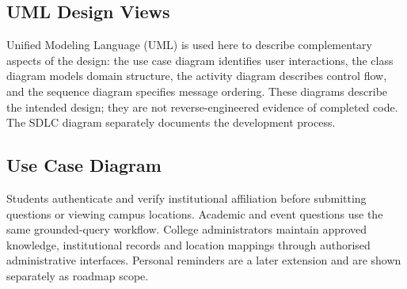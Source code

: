 \documentclass{tietreport}
\begin{document}
\subsection{UML Design Views}

Unified Modeling Language (UML) is used here to describe complementary aspects
of the design: the use case diagram identifies user interactions, the class
diagram models domain structure, the activity diagram describes control flow,
and the sequence diagram specifies message ordering. These diagrams describe
the intended design; they are not reverse-engineered evidence of completed code.
The SDLC diagram separately documents the development process.

\subsection{Use Case Diagram}

Students authenticate and verify institutional affiliation before submitting
questions or viewing campus locations. Academic and event questions use the
same grounded-query workflow. College administrators maintain approved
knowledge, institutional records and location mappings through authorised
administrative interfaces. Personal reminders are a later extension and are
shown separately as roadmap scope.
\end{document}
